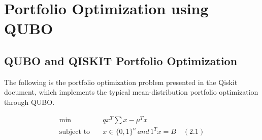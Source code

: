 \section{Portfolio Optimization using QUBO}
\subsection{QUBO and QISKIT Portfolio Optimization} 


The following is the portfolio optimization problem presented in the Qiskit document, which implements the typical mean-distribution portfolio optimization through QUBO. 

\begin{align*}
\min \ \ \, \quad &qx^{T}\displaystyle\sum x - \mu^{T}x \\ 
\text{subject to}\quad &x\in\{0,1\}^n\,and\,1^Tx=B \quad(2.1)
\end{align*}
 
